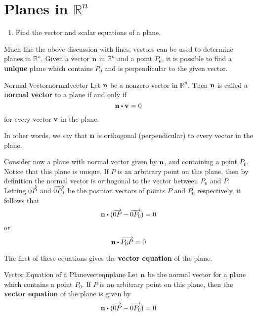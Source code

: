 \pagebreak
\section{Planes in $\mathbb{R}^n$}

\begin{outcome}

\begin{enumerate}

\item[A.] Find the vector and scalar equations of a plane.

\end{enumerate}
\end{outcome}

Much like the above discussion with lines, vectors can be used to determine planes in $\mathbb{R}^n$. Given a vector ${\bf n}$ in $\mathbb{R}^n$ and a point $P_0$, it is possible to find a \textbf{unique} plane which contains $P_0$ and is perpendicular to the given vector. 

\begin{definition}{Normal Vector}{normalvector}
Let ${\bf n}$ be a nonzero vector in $\mathbb{R}^n$. Then ${\bf n}$ is called a \textbf{normal vector} to a plane if and only if 
\[
\vect{n} \dotprod \vect{v} = 0
\]
for every vector ${\bf v}$ in the plane. 
\end{definition}

In other words, we say that ${\bf n}$ is orthogonal (perpendicular) to every vector in the plane. 

Consider now a plane with normal vector given by ${\bf n}$, and containing a point $P_0$. Notice that this plane is unique. If $P$ is an arbitrary point on this plane, then by definition the normal vector is orthogonal to the vector between $P_0$ and $P$. Letting $\overrightarrow{0P}$ and $\overrightarrow{0P_0}$ be the position vectors of points $P$ and $P_0$ respectively, it follows that 
\[
\vect{n} \dotprod (\longvect{0P} - \longvect{0P_0}) = 0 
\]
or
\[
\vect{n} \dotprod \longvect{P_0P} = 0 
\]

The first of these equations gives the \textbf{vector equation} of the plane. 

\begin{definition}{Vector Equation of a Plane}{vecteqnplane}
Let ${\bf n}$ be the normal vector for a plane which contains a point $P_0$. If $P$ is an arbitrary point on this plane, then the \textbf{vector equation} of the plane is given by 
\[
\vect{n} \dotprod (\longvect{0P} - \longvect{0P_0}) = 0
\]
\end{definition}

